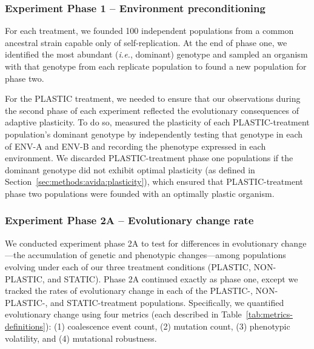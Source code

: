 \documentclass[utf8]{frontiersSCNS} %
\begin{document}
\begin{raggedbottom}
\subsubsection{Experiment Phase 1 -- Environment preconditioning}
\label{sec:methods:experiment:phase-one}

For each treatment, we founded 100 independent populations from a common ancestral strain capable only of self-replication.
At the end of phase one, we identified the most abundant (\textit{i.e.}, dominant) genotype and sampled an organism with that genotype from each replicate population to found a new population for phase two.

For the PLASTIC treatment, we needed to ensure that our observations during the second phase of each experiment reflected the evolutionary consequences of adaptive plasticity. 
To do so, measured the plasticity of each PLASTIC-treatment population's dominant genotype by independently testing that genotype in each of ENV-A and ENV-B and recording the phenotype expressed in each environment.
We discarded PLASTIC-treatment phase one populations if the dominant genotype did not exhibit optimal plasticity (as defined in Section~\ref{sec:methods:avida:plasticity}), which ensured that PLASTIC-treatment phase two populations were founded with an optimally plastic organism.


\subsubsection{Experiment Phase 2A -- Evolutionary change rate}
\label{sec:methods:exp:evolutionary-change-rate}

We conducted experiment phase 2A to test for differences in evolutionary change---the accumulation of genetic and phenotypic changes---among populations evolving under each of our three treatment conditions (PLASTIC, NON-PLASTIC, and STATIC). 
Phase 2A continued exactly as phase one, except we tracked the rates of evolutionary change in each of the PLASTIC-, NON-PLASTIC-, and STATIC-treatment populations.
Specifically, we quantified evolutionary change using four metrics (each described in Table~\ref{tab:metrics-definitions}):
(1) coalescence event count,
(2) mutation count,
(3) phenotypic volatility,
and (4) mutational robustness.


\end{raggedbottom}
\end{document}
